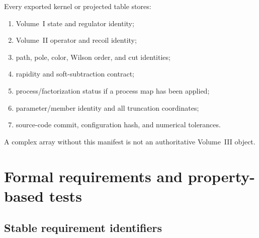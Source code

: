 \documentclass[11pt]{article}
\begin{document}
Every exported kernel or projected table stores:
\begin{enumerate}
\item Volume~I state and regulator identity;
\item Volume~II operator and recoil identity;
\item path, pole, color, Wilson order, and cut identities;
\item rapidity and soft-subtraction contract;
\item process/factorization status if a process map has been applied;
\item parameter/member identity and all truncation coordinates;
\item source-code commit, configuration hash, and numerical tolerances.
\end{enumerate}
A complex array without this manifest is not an authoritative Volume~III
object.

\section{Formal requirements and property-based tests}
\label{sec:tests}

\subsection{Stable requirement identifiers}
\end{document}
